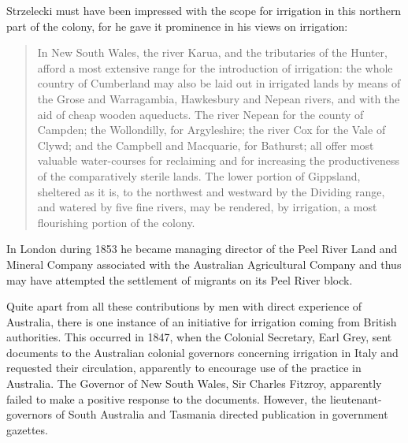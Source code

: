 Strzelecki must have been impressed with the scope for irrigation in
this northern part of the colony, for he gave it prominence in his
views on irrigation:
\begin{quote}
	In New South Wales, the river Karua,  and
	the tributaries of the Hunter,  afford a
	most extensive range for the introduction of irrigation: the
	whole country of Cumberland may also be laid out in irrigated
	lands by means of the Grose  and
	Warragambia,  Hawkesbury
	 and Nepean 
	rivers, and with the aid of cheap wooden aqueducts.  The river
	Nepean for the county of Campden; the Wollondilly,
	 for Argyleshire; the river Cox
	 for the Vale of Clywd; and the Campbell
	 and Macquarie, 
	for Bathurst; all offer most valuable water-courses for
	reclaiming and for increasing the productiveness of the
	comparatively sterile lands. The lower portion of Gippsland,
	 sheltered as it is, to the northwest and
	westward by the Dividing range, and watered by five fine
	rivers, may be rendered, by irrigation, a most flourishing
	portion of the colony.
\end{quote}

In London during 1853 he became managing director of the Peel River
Land and Mineral Company associated with the Australian Agricultural
Company and thus may have attempted the settlement of migrants on its
Peel River 
block.

Quite apart from all these contributions by men with direct experience
of Australia, there is one instance of an initiative for irrigation
coming from British authorities.  This occurred in 1847, when the
Colonial Secretary, Earl Grey,  sent documents to
the Australian colonial governors concerning irrigation in Italy and
requested their circulation, apparently to encourage use of the
practice in Australia.  The Governor of New South Wales, Sir Charles
Fitzroy,  apparently failed to make a positive
response to the documents.  However, the lieutenant-governors of South
Australia and Tasmania directed publication in government
gazettes.

